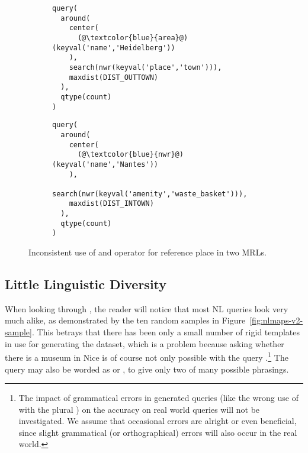 \begin{figure}[h]
  \centering
  \begin{subfigure}{\textwidth}
    \begin{lstlisting}[style=MyMRL]
query(
  around(
    center(
      (@\textcolor{blue}{area}@)(keyval('name','Heidelberg'))
    ),
    search(nwr(keyval('place','town'))),
    maxdist(DIST_OUTTOWN)
  ),
  qtype(count)
)
    \end{lstlisting}
    \caption{}
  \end{subfigure}
  \begin{subfigure}{\textwidth}
    \begin{lstlisting}[style=MyMRL]
query(
  around(
    center(
      (@\textcolor{blue}{nwr}@)(keyval('name','Nantes'))
    ),
    search(nwr(keyval('amenity','waste_basket'))),
    maxdist(DIST_INTOWN)
  ),
  qtype(count)
)
    \end{lstlisting}
    \caption{}
  \end{subfigure}
  \caption[Inconsistent operators in \emph{around} queries]{Inconsistent use of
     and  operator for reference place in two MRLs.}
  \label{fig:around-with-one}
\end{figure}

\subsection{Little Linguistic Diversity}
\label{sec:little-linguistic-diversity}

When looking through \nlmapstwo{}, the reader will notice that most NL queries
look very much alike, as demonstrated by the ten random samples in
Figure~\ref{fig:nlmaps-v2-sample}. This betrays that there has been only a small
number of rigid templates in use for generating the dataset, which is a problem
because asking whether there is a museum in Nice is of course not only possible
with the query .\footnote{The impact of grammatical
  errors in generated queries (like the wrong use of  with the
  plural ) on the accuracy on real world queries will not be
  investigated. We assume that occasional errors are alright or even beneficial,
  since slight grammatical (or orthographical) errors will also occur in the
  real world.} The query may also be worded as  or , to give only two of many possible
phrasings.

